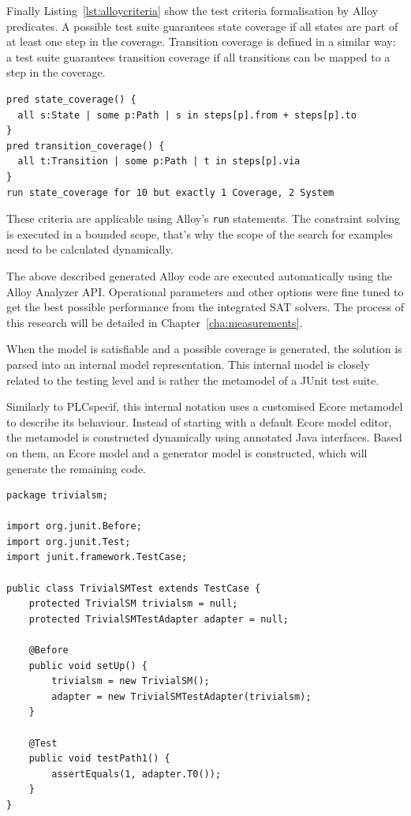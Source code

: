 Finally Listing~\ref{lst:alloycriteria} show the test criteria formalisation by Alloy predicates. A possible test suite guarantees state coverage if all states are part of at least one step in the coverage. Transition coverage is defined in a similar way: a test suite guarantees transition coverage if all transitions can be mapped to a step in the coverage.

\begin{lstlisting}[label={lst:alloycriteria}, caption=Formalising criteria with Alloy,breaklines=true]
pred state_coverage() {
  all s:State | some p:Path | s in steps[p].from + steps[p].to
}
pred transition_coverage() {
  all t:Transition | some p:Path | t in steps[p].via
}
run state_coverage for 10 but exactly 1 Coverage, 2 System
\end{lstlisting}

These criteria are applicable using Alloy's \texttt{run} statements. The constraint solving is executed in a bounded scope, that's why the scope of the search for examples need to be calculated dynamically.

The above described generated Alloy code are executed automatically using the Alloy Analyzer API. Operational parameters and other options were fine tuned to get the best possible performance from the integrated SAT solvers. The process of this research will be detailed in Chapter~\ref{cha:measurements}.

When the model is satisfiable and a possible coverage is generated, the solution is parsed into an internal model representation. This internal model is closely related to the testing level and is rather the metamodel of a JUnit test suite.

Similarly to PLCspecif, this internal notation uses a customised Ecore metamodel to describe its behaviour. Instead of starting with a default Ecore model editor, the metamodel is constructed dynamically using annotated Java interfaces. Based on them, an Ecore model and a generator model is constructed, which will generate the remaining code.

\begin{lstlisting}[label={lst:testsuite}, caption=Generated JUnit test suite,breaklines=true]
package trivialsm;

import org.junit.Before;
import org.junit.Test;
import junit.framework.TestCase;

public class TrivialSMTest extends TestCase {
	protected TrivialSM trivialsm = null;
	protected TrivialSMTestAdapter adapter = null;
	   
	@Before 
	public void setUp() {
		trivialsm = new TrivialSM();
		adapter = new TrivialSMTestAdapter(trivialsm);
	}
	
	@Test
	public void testPath1() {
		assertEquals(1, adapter.T0());
	}
}
\end{lstlisting}

